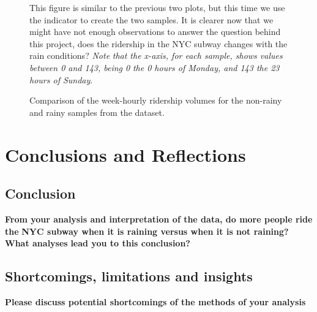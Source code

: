 \documentclass[a4paper,12pt,english]{sphinxmanual}
\begin{document}
\begin{figure}[htbp]
\centering
\capstart

\caption{Comparison of the week-hourly ridership volumes for the non-rainy and rainy
samples from the  dataset.}{\small 
This figure is similar to the previous two plots, but this time we use the
 indicator to create the two samples. It is clearer now that we
might have not enough observations to answer the question behind this project,
does the ridership in the NYC subway changes with the rain conditions? \emph{Note}
\emph{that the x-axis, for each sample, shows values between 0 and 143, being 0}
\emph{the 0 hours of Monday, and 143 the 23 hours of Sunday}.
}\label{section3:figure47}\end{figure}


\chapter{Conclusions and Reflections}
\label{section4::doc}\label{section4:conclusions-and-reflections}

\section{Conclusion}
\label{section4:conclusion}
\textbf{From your analysis and interpretation of the data, do more people ride the}
\textbf{NYC subway when it is raining versus when it is not raining?  What analyses}
\textbf{lead you to this conclusion?}


\section{Shortcomings, limitations and insights}
\label{section4:shortcomings-limitations-and-insights}
\textbf{Please discuss potential shortcomings of the methods of your analysis}
\end{document}
